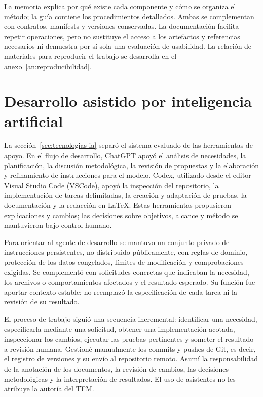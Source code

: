 La memoria explica por qué existe cada componente y cómo se organiza el método;
la guía contiene los procedimientos detallados. Ambas se complementan con
contratos, manifests y versiones conservadas. La documentación facilita
repetir operaciones, pero no sustituye el acceso a los artefactos y referencias
necesarios ni demuestra por sí sola una evaluación de usabilidad. La relación
de materiales para reproducir el trabajo se desarrolla en el
anexo~\ref{an:reproducibilidad}.

\section{Desarrollo asistido por inteligencia artificial}
\label{sec:ia-desarrollo}
La sección~\ref{sec:tecnologias-ia} separó el sistema evaluado de las
herramientas de apoyo. En el flujo de desarrollo, ChatGPT apoyó el análisis
de necesidades, la planificación, la discusión
metodológica, la revisión de propuestas y la elaboración y refinamiento de
instrucciones para el modelo. Codex, utilizado desde el editor Visual Studio
Code (VSCode), apoyó la inspección del repositorio, la implementación de tareas
delimitadas, la creación y adaptación de pruebas, la documentación y la
redacción en LaTeX. Estas herramientas propusieron explicaciones y cambios;
las decisiones sobre objetivos, alcance y método se mantuvieron bajo control
humano.

Para orientar al agente de desarrollo se mantuvo un conjunto privado de
instrucciones persistentes, no distribuido públicamente, con reglas de dominio,
protección de los datos congelados, límites de modificación y comprobaciones
exigidas. Se complementó con solicitudes concretas que indicaban la necesidad,
los archivos o comportamientos afectados y el resultado esperado. Su función
fue aportar contexto estable; no reemplazó la especificación de cada tarea ni
la revisión de su resultado.

El proceso de trabajo siguió una secuencia incremental: identificar una
necesidad, especificarla mediante una solicitud, obtener una implementación
acotada, inspeccionar los cambios, ejecutar las pruebas pertinentes y someter
el resultado a revisión humana. Gestioné manualmente los commits y
pushes de Git, es decir, el registro de versiones y su envío al repositorio
remoto. Asumí la responsabilidad de la anotación de los documentos, la revisión
de cambios, las decisiones metodológicas y la interpretación de resultados.
El uso de asistentes no les atribuye la autoría del TFM.


